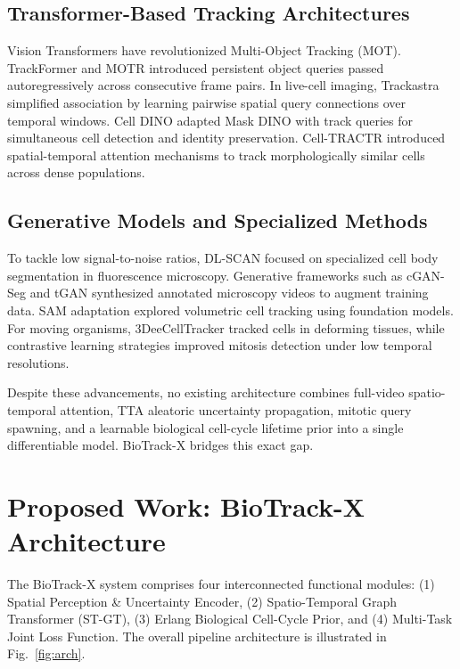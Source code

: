 \documentclass[10pt,journal,compsoc]{IEEEtran}
\begin{document}
\subsection{Transformer-Based Tracking Architectures}
Vision Transformers have revolutionized Multi-Object Tracking (MOT). TrackFormer \cite{trackformer} and MOTR \cite{motr} introduced persistent object queries passed autoregressively across consecutive frame pairs. In live-cell imaging, Trackastra \cite{trackastra} simplified association by learning pairwise spatial query connections over temporal windows. Cell DINO \cite{celldino} adapted Mask DINO with track queries for simultaneous cell detection and identity preservation. Cell-TRACTR \cite{celltractr} introduced spatial-temporal attention mechanisms to track morphologically similar cells across dense populations.

\subsection{Generative Models and Specialized Methods}
To tackle low signal-to-noise ratios, DL-SCAN \cite{dlscan} focused on specialized cell body segmentation in fluorescence microscopy. Generative frameworks such as cGAN-Seg \cite{cganseg} and tGAN \cite{tgan} synthesized annotated microscopy videos to augment training data. SAM adaptation \cite{sam} explored volumetric cell tracking using foundation models. For moving organisms, 3DeeCellTracker \cite{deecelltracker} tracked cells in deforming tissues, while contrastive learning strategies \cite{contrastive} improved mitosis detection under low temporal resolutions.

Despite these advancements, no existing architecture combines full-video spatio-temporal attention, TTA aleatoric uncertainty propagation, mitotic query spawning, and a learnable biological cell-cycle lifetime prior into a single differentiable model. BioTrack-X bridges this exact gap.

\section{Proposed Work: BioTrack-X Architecture}
\label{sec:architecture}

The BioTrack-X system comprises four interconnected functional modules: (1) Spatial Perception \& Uncertainty Encoder, (2) Spatio-Temporal Graph Transformer (ST-GT), (3) Erlang Biological Cell-Cycle Prior, and (4) Multi-Task Joint Loss Function. The overall pipeline architecture is illustrated in Fig.~\ref{fig:arch}.
\end{document}
